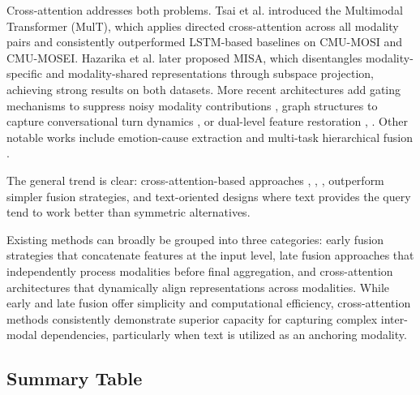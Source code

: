 \documentclass[conference]{IEEEtran}
\begin{document}
Cross-attention addresses both problems. Tsai et al. \cite{tsai2019multimodal} introduced the Multimodal Transformer (MulT), which applies directed cross-attention across all modality pairs and consistently outperformed LSTM-based baselines on CMU-MOSI and CMU-MOSEI. Hazarika et al. \cite{hazarika2020misa} later proposed MISA, which disentangles modality-specific and modality-shared representations through subspace projection, achieving strong results on both datasets. More recent architectures add gating mechanisms to suppress noisy modality contributions \cite{lian2023gcma}, graph structures to capture conversational turn dynamics \cite{li2023graph}, or dual-level feature restoration \cite{sun2023efficient}, \cite{wang2023cross}. Other notable works include emotion-cause extraction \cite{wang2023multimodal} and multi-task hierarchical fusion \cite{wang2024cross}.

The general trend is clear: cross-attention-based approaches \cite{rajan2022cross}, \cite{x2024multimodal}, \cite{wang2020transmodality}, \cite{hui2025dynamic} outperform simpler fusion strategies, and text-oriented designs where text provides the query \cite{wu2021text} tend to work better than symmetric alternatives.

Existing methods can broadly be grouped into three categories: early fusion strategies that concatenate features at the input level, late fusion approaches that independently process modalities before final aggregation, and cross-attention architectures that dynamically align representations across modalities. While early and late fusion offer simplicity and computational efficiency, cross-attention methods consistently demonstrate superior capacity for capturing complex inter-modal dependencies, particularly when text is utilized as an anchoring modality.

\subsection{Summary Table}
\end{document}
